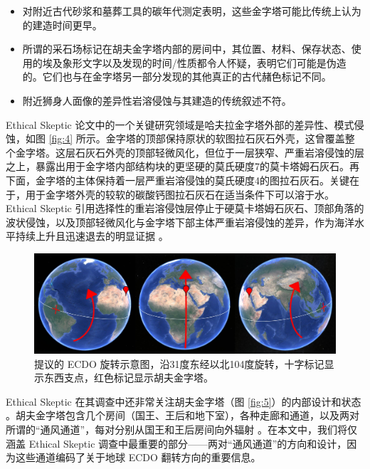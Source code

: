 \documentclass[10pt,twocolumn,letterpaper]{article}
\begin{document}
\begin{flushleft}
\begin{itemize}
    \item 对附近古代砂浆和墓葬工具的碳年代测定表明，这些金字塔可能比传统上认为的建造时间更早。
    \item 所谓的采石场标记在胡夫金字塔内部的房间中，其位置、材料、保存状态、使用的埃及象形文字以及发现的时间/性质都令人怀疑，表明它们可能是伪造的。它们也与在金字塔另一部分发现的其他真正的古代赭色标记不同。
    \item 附近狮身人面像的差异性岩溶侵蚀与其建造的传统叙述不符。
\end{itemize}
\end{flushleft}


Ethical Skeptic 论文中的一个关键研究领域是哈夫拉金字塔外部的差异性、模式侵蚀，如图 \ref{fig:4} 所示。金字塔的顶部保持原状的软图拉石灰石外壳，这曾覆盖整个金字塔。这层石灰石外壳的顶部轻微风化，但位于一层狭窄、严重岩溶侵蚀的层之上，暴露出用于金字塔内部结构块的更坚硬的莫氏硬度7的莫卡塔姆石灰石。再下面，金字塔的主体保持着一层严重岩溶侵蚀的莫氏硬度4的图拉石灰石。关键在于，用于金字塔外壳的较软的碳酸钙图拉石灰石在适当条件下可以溶于水。Ethical Skeptic 引用选择性的重岩溶侵蚀层停止于硬莫卡塔姆石灰石、顶部角落的波状侵蚀，以及顶部轻微风化与金字塔下部主体严重岩溶侵蚀的差异，作为海洋水平持续上升且迅速退去的明显证据 \cite{27}。

\begin{figure}[b]
\begin{center}
\includegraphics[width=1\textwidth]{drawing.jpg}
\end{center}
   \caption{提议的 ECDO 旋转示意图，沿31度东经以北104度旋转，十字标记显示东西支点，红色标记显示胡夫金字塔。}
\label{fig:6}
\end{figure}

Ethical Skeptic 在其调查中还非常关注胡夫金字塔（图 \ref{fig:5}）的内部设计和状态 \cite{28}。胡夫金字塔包含几个房间（国王、王后和地下室），各种走廊和通道，以及两对所谓的“通风通道”，每对分别从国王和王后房间向外辐射 \cite{29,30}。在本文中，我们将仅涵盖 Ethical Skeptic 调查中最重要的部分——两对“通风通道”的方向和设计，因为这些通道编码了关于地球 ECDO 翻转方向的重要信息。
\end{document}
